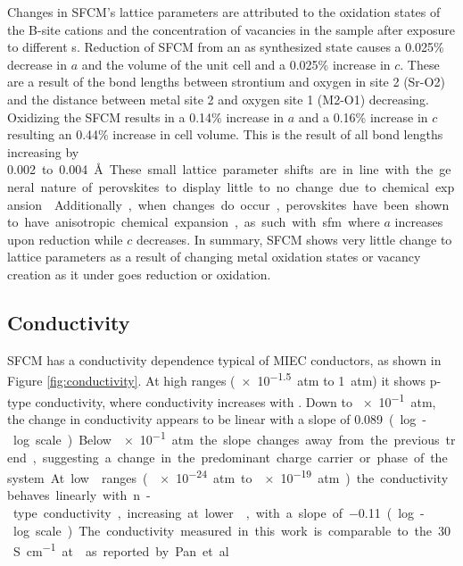     Changes in SFCM's lattice parameters are attributed to the oxidation states of the B-site cations and the concentration of vacancies in the sample after exposure to different s.
    Reduction of SFCM from an as synthesized state causes a 0.025\% decrease in $a$ and the volume of the unit cell and a 0.025\% increase in $c$.
    These are a result of the bond lengths between strontium and oxygen in site 2 (Sr-O2) and the distance between metal site 2 and oxygen site 1 (M2-O1) decreasing. %
    Oxidizing the SFCM results in a 0.14\% increase in $a$ and a 0.16\% increase in $c$ resulting an 0.44\% increase in cell volume.
    This is the result of all bond lengths increasing by \SI{0.002} to \SI{0.004}{\angstrom}.
    These small lattice parameter shifts are in line with the general nature of perovskites to display little to no change due to chemical expansion.\cite{Bishop2014}
    Additionally, when changes do occur, perovskites have been shown to have anisotropic chemical expansion, as such with \gls{sfm} where $a$ increases upon reduction while $c$ decreases.\cite{Tsvetkov2016}
    In summary, SFCM shows very little change to lattice parameters as a result of changing metal oxidation states or vacancy creation as it under goes reduction or oxidation.

    \subsection{Conductivity}
    SFCM has a conductivity dependence typical of MIEC conductors, as shown in Figure \ref{fig:conductivity}.
    At high  ranges (\SI{e-1.5}{atm} to \SI{1}{atm}) it shows p-type conductivity, where conductivity increases with .
    Down to \SI{e-1}{atm}, the change in conductivity appears to be linear with a slope of \SI{0.089} (log-log scale).
    Below \SI{e-1}{atm} the slope changes away from the previous trend, suggesting a change in the predominant charge carrier or phase of the system.
    At low  ranges (\SI{e-24}{atm} to \SI{e-19}{atm}) the conductivity behaves linearly with n-type conductivity, increasing at lower , with a slope of \SI{-0.11} (log-log scale).
    The conductivity measured in this work is comparable to the \SI{30}{S\per\centi\meter} at  as reported by Pan et. al.\cite{Pan}

